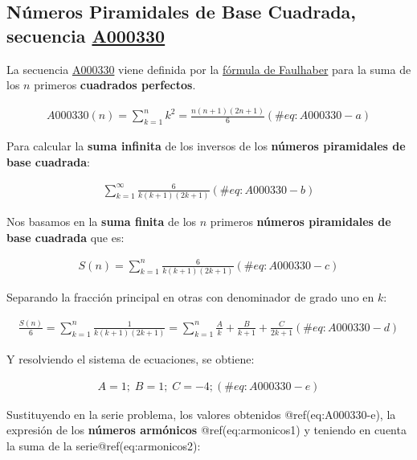 \documentclass[
  letterpaper,
  DIV=11,
  numbers=noendperiod]{scrreprt}
\begin{document}
\hypertarget{nuxfameros-piramidales-de-base-cuadrada-secuencia-a000330}{%
\subsection{\texorpdfstring{Números Piramidales de Base Cuadrada,
secuencia
\href{https://oeis.org/A000330}{A000330}}{Números Piramidales de Base Cuadrada, secuencia A000330}}\label{nuxfameros-piramidales-de-base-cuadrada-secuencia-a000330}}

La secuencia \href{https://oeis.org/A000330}{A000330} viene definida por
la \href{https://mathworld.wolfram.com/FaulhabersFormula.html}{fórmula
de Faulhaber} para la suma de los \(n\) primeros \textbf{cuadrados
perfectos}.

\begin{multline}
A000330(n)=\sum_{k=1}^{n}{k^2}=\frac{n(n+1)(2n+1)}{6}
  (\#eq:A000330-a)
\end{multline}

Para calcular la \textbf{suma infinita} de los inversos de los
\textbf{números piramidales de base cuadrada}:

\begin{multline}
   \sum_{k=1}^{\infty}{\frac{6}{k(k+1)(2k+1)}}
  (\#eq:A000330-b)
\end{multline}

Nos basamos en la \textbf{suma finita} de los \(n\) primeros
\textbf{números piramidales de base cuadrada} que es:

\begin{multline}
   S(n)=\sum_{k=1}^{n}{\frac{6}{k(k+1)(2k+1)}}
  (\#eq:A000330-c)
\end{multline}

Separando la fracción principal en otras con denominador de grado uno en
\(k\):

\begin{multline}
\frac{S(n)}{6}=
\sum_{k=1}^{n}{\frac{1}{k(k+1)(2k+1)}} =
\sum_{k=1}^{n}{\frac{A}{k}+\frac{B}{k+1}+\frac{C}{2k+1}}
 (\#eq:A000330-d)
\end{multline}

Y resolviendo el sistema de ecuaciones, se obtiene:

\begin{multline}
A=1 ;\; B=1;\; C=-4;
 (\#eq:A000330-e)
\end{multline}

Sustituyendo en la serie problema, los valores obtenidos
@ref(eq:A000330-e), la expresión de los \textbf{números armónicos}
@ref(eq:armonicos1) y teniendo en cuenta la suma de la
serie@ref(eq:armonicos2):
\end{document}
